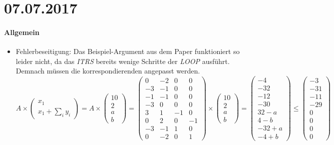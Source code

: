 \section*{07.07.2017}

\paragraph{Allgemein}
\begin{itemize}
	\item Fehlerbeseitigung: \newline
		Das Beispiel-Argument aus dem Paper funktioniert so leider nicht, da das \emph{ITRS} bereits wenige Schritte der \emph{LOOP} ausführt.\newline
		Demnach müssen die korrespondierenden  angepasst werden. 
		$ A \times \begin{pmatrix} x_1 \\ x_1 + \sum_{i}y_i \end{pmatrix} = A \times \begin{pmatrix} 10 \\ 2 \\ a \\ b \end{pmatrix} =
		\begin{pmatrix}
			0 & -2 & 0 & 0 \\
			-3 & -1 & 0 & 0 \\
			-1 & -1 & 0 & 0 \\
			-3 & 0 & 0 & 0 \\
			3 & 1 & -1 & 0 \\
			0 & 2 & 0 & -1 \\
			-3 & -1 & 1 & 0 \\
			0 & -2 & 0 & 1
		\end{pmatrix} \times  \begin{pmatrix} 10 \\ 2 \\ a \\ b \end{pmatrix} =  \begin{pmatrix} -4 \\ -32 \\ -12 \\ -30 \\ 32-a \\ 4-b \\ -32+a \\ -4+b \end{pmatrix} \le  \begin{pmatrix} -3 \\ -31 \\ -11 \\ -29 \\ 0 \\ 0 \\ 0 \\ 0 \end{pmatrix}$

\end{itemize}
